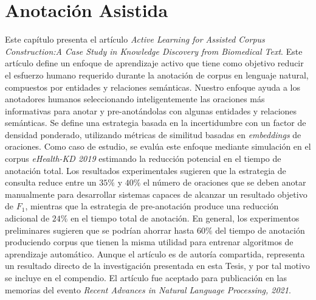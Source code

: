 
\chapter[Anotación Asistida: \textit{Active Learning for Assisted Corpus Construction:A Case Study in Knowledge Discovery from Biomedical Text}]{Anotación Asistida}
\label{Chap:Annotation}

Este capítulo presenta el artículo \textit{Active Learning for Assisted Corpus Construction:A Case Study in Knowledge Discovery from Biomedical Text}.
Este artículo define un enfoque de aprendizaje activo que tiene como objetivo reducir el esfuerzo humano requerido durante la anotación de corpus en lenguaje natural, compuestos por entidades y relaciones semánticas. Nuestro enfoque ayuda a los anotadores humanos seleccionando inteligentemente las oraciones más informativas para anotar y pre-anotándolas con algunas entidades y relaciones semánticas. Se define una estrategia basada en la incertidumbre con un factor de densidad ponderado, utilizando métricas de similitud basadas en \textit{embeddings} de oraciones. Como caso de estudio, se evalúa este enfoque mediante simulación en el corpus \textit{eHealth-KD 2019} estimando la reducción potencial en el tiempo de anotación total. Los resultados experimentales sugieren que la estrategia de consulta reduce entre un $35\%$ y $40\%$ el número de oraciones que se deben anotar manualmente para desarrollar sistemas capaces de alcanzar un resultado objetivo de $F_1$,
mientras que la estrategia de pre-anotación produce una reducción adicional de $24\%$ en el tiempo total de anotación. En general, los experimentos preliminares sugieren que se podrían ahorrar hasta $60\%$ del tiempo de anotación produciendo corpus que tienen la misma utilidad para entrenar algoritmos de aprendizaje automático.
Aunque el artículo es de autoría compartida, representa un resultado directo de la investigación presentada en esta Tesis, y por tal motivo se incluye en el compendio.
El artículo fue aceptado para publicación en las memorias del evento \textit{Recent Advances in Natural Language Processing, 2021}.